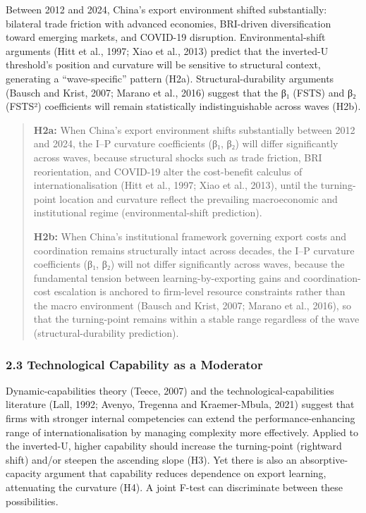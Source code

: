 \documentclass[
  12pt,a4paper]{article}
\begin{document}
Between 2012 and 2024, China's export environment shifted substantially:
bilateral trade friction with advanced economies, BRI-driven
diversification toward emerging markets, and COVID-19 disruption.
Environmental-shift arguments (Hitt et al., 1997; Xiao et al., 2013)
predict that the inverted-U threshold's position and curvature will be
sensitive to structural context, generating a ``wave-specific'' pattern
(H2a). Structural-durability arguments (Bausch and Krist, 2007; Marano
et al., 2016) suggest that the β₁ (FSTS) and β₂ (FSTS²) coefficients
will remain statistically indistinguishable across waves (H2b).

\begin{quote}
\textbf{H2a:} When China's export environment shifts substantially
between 2012 and 2024, the I--P curvature coefficients (β₁, β₂) will
differ significantly across waves, because structural shocks such as
trade friction, BRI reorientation, and COVID-19 alter the cost-benefit
calculus of internationalisation (Hitt et al., 1997; Xiao et al., 2013),
until the turning-point location and curvature reflect the prevailing
macroeconomic and institutional regime (environmental-shift prediction).

\textbf{H2b:} When China's institutional framework governing export
costs and coordination remains structurally intact across decades, the
I--P curvature coefficients (β₁, β₂) will not differ significantly
across waves, because the fundamental tension between
learning-by-exporting gains and coordination-cost escalation is anchored
to firm-level resource constraints rather than the macro environment
(Bausch and Krist, 2007; Marano et al., 2016), so that the turning-point
remains within a stable range regardless of the wave
(structural-durability prediction).
\end{quote}

\hypertarget{technological-capability-as-a-moderator}{%
\subsubsection{2.3 Technological Capability as a
Moderator}\label{technological-capability-as-a-moderator}}

Dynamic-capabilities theory (Teece, 2007) and the
technological-capabilities literature (Lall, 1992; Avenyo, Tregenna and
Kraemer-Mbula, 2021) suggest that firms with stronger internal
competencies can extend the performance-enhancing range of
internationalisation by managing complexity more effectively. Applied to
the inverted-U, higher capability should increase the turning-point
(rightward shift) and/or steepen the ascending slope (H3). Yet there is
also an absorptive-capacity argument that capability reduces dependence
on export learning, attenuating the curvature (H4). A joint F-test can
discriminate between these possibilities.
\end{document}
